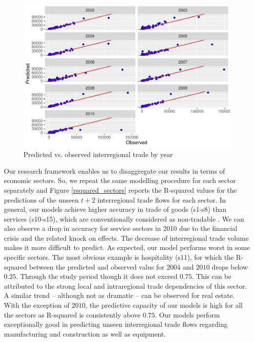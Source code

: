 \documentclass[]{interact}
\theoremstyle{plain}%
\theoremstyle{definition}
\theoremstyle{remark}
\begin{document}
\begin{figure}[p]
\includegraphics[width=1\linewidth]{hl_v2_files/figure-latex/unnamed-chunk-7-1} \caption{\label{prediction}Predicted vs. observed interregional trade by year}\label{fig:unnamed-chunk-7}
\end{figure}

Our research framework enables us to disaggregate our results in terms
of economic sectors. So, we repeat the same modelling procedure for each
sector separately and Figure \ref{rsquared_sectors} reports the
R-squared values for the predictions of the unseen \(t + 2\)
interregional trade flows for each sector. In general, our models
achieve higher accuracy in trade of goods (s1-s8) than services
(s10-s15), which are conventionally considered as non-tradable
\citep{jensen2005}. We can also observe a drop in accuracy for service
sectors in 2010 due to the financial crisis and the related knock on
effects. The decrease of interregional trade volume makes it more
difficult to predict. As expected, our model performs worst in some
specific sectors. The most obvious example is hospitality (s11), for
which the R-squared between the predicted and observed valus for
\(2004\) and \(2010\) drops below \(0.25\). Through the study period
though it does not exceed \(0.75\). This can be attributed to the strong
local and intraregional trade dependencies of this sector. A similar
trend -- although not as dramatic -- can be observed for real estate.
With the exception of \(2010\), the predictive capacity of our models is
high for all the sectors as R-squared is consistently above \(0.75\).
Our models perform exceptionally good in predicting unseen interregional
trade flows regarding manufacturing and construction as well as
equipment.
\end{document}
